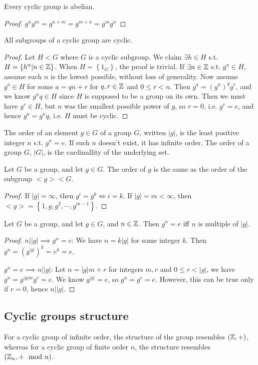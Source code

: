 \begin{theorem}
  Every cyclic group is abelian.
\end{theorem}
\begin{proof}
  $g^n g^m = g^{n+m} = g^{m+n} = g^m g^n$
\end{proof}

\begin{theorem}
  All subgroups of a cyclic group are cyclic.
\end{theorem}
\begin{proof}
  Let $H<G$ where $G$ is a cyclic subgroup. We claim $\exists h\in H$ s.t. $H=\left\{
  h^n | n\in\mathbb Z  \right\}$. When $H=\left\{ 1_G \right\}$, the proof is trivial. If
  $\exists n\in\mathbb Z$ s.t. $g^n\in H$, assume such $n$ is the lowest possible, without
  loss of generality. Now assume $g^a\in H$ for some $a=qn+r$ for $q,r\in \mathbb Z$ and
  $0\leq r < n$. Then $g^a=(g^n)^q g^r$, and we know $g^nq\in H$ since $H$ is supposed
  to be a group on its own. Then we must have $g^r\in H$, but $n$ was the smallest
  possible power of $g$, so $r=0$, i.e. $g^r=e$, and hence $g^a = g^nq$, i.e. $H$ must be
  cyclic.
\end{proof}


\begin{definition}
  The order of an element $g\in G$ of a group $G$, written $|g|$, is the least positive
  integer $n$ s.t. $g^n=e$. If such $n$ doesn't exist, it has infinite order. The order
  of a group $G$, $|G|$, is the cardinallity of the underlying set.
  \label{orderGroup}
\end{definition}

\begin{theorem}
  Let $G$ be a group, and let $g\in G$. The order of $g$ is the same as the order of the
  subgroup $<g> < G$.
\end{theorem}
\begin{proof}
  If $|g|=\infty$, then $g^i=g^k \iff i=k$. If $|g|=m<\infty$, then $<g>=\left\{ 1,g,g^2,
  \cdots, g^{m-1} \right\}$.
\end{proof}

\begin{theorem}
  Let $G$ be a group, and let $g\in G$, and $n\in\mathbb Z$. Then $g^n=e$ iff $n$ is multiple
  of $|g|$.
\end{theorem}
\begin{proof}
  $n\Big | |g| \implies g^n = e$: We have $n=k|g|$ for some integer $k$. Then
  $g^n=(g^{|g|})^k = e^k = e$.

  $g^n=e \implies n\Big | |g|$: Let $n=|g|m + r$ for integers $m,r$ and $0\leq r < |g|$,
  we have $g^n=g^{|g|m} g^r = e$. We know $g^{|g|}=e$, so $g^n = g^r=e$. However, this can
  be true only if $r=0$, hence $n\Big | |g|$.
\end{proof}

\subsection{Cyclic groups structure}
For a cyclic group of infinite order, the structure of the group resembles
$(\mathbb Z,+)$, whereas for a cyclic group of finite order $n$, the structure resembles
$(\mathbb Z_n,
+\mod n)$.
